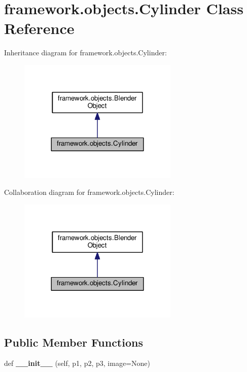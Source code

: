 \hypertarget{classframework_1_1objects_1_1Cylinder}{}\section{framework.\+objects.\+Cylinder Class Reference}
\label{classframework_1_1objects_1_1Cylinder}


Inheritance diagram for framework.\+objects.\+Cylinder\+:
\nopagebreak
\begin{figure}[H]
\begin{center}
\leavevmode
\includegraphics[width=216pt]{classframework_1_1objects_1_1Cylinder__inherit__graph}
\end{center}
\end{figure}


Collaboration diagram for framework.\+objects.\+Cylinder\+:
\nopagebreak
\begin{figure}[H]
\begin{center}
\leavevmode
\includegraphics[width=216pt]{classframework_1_1objects_1_1Cylinder__coll__graph}
\end{center}
\end{figure}
\subsection*{Public Member Functions}
\begin{DoxyCompactItemize}
\item 
def {\bfseries \+\_\+\+\_\+init\+\_\+\+\_\+} (self, p1, p2, p3, image=None)\hypertarget{classframework_1_1objects_1_1Cylinder_a78c169cac92f2143b6ee017361061656}{}\label{classframework_1_1objects_1_1Cylinder_a78c169cac92f2143b6ee017361061656}

\end{DoxyCompactItemize}
